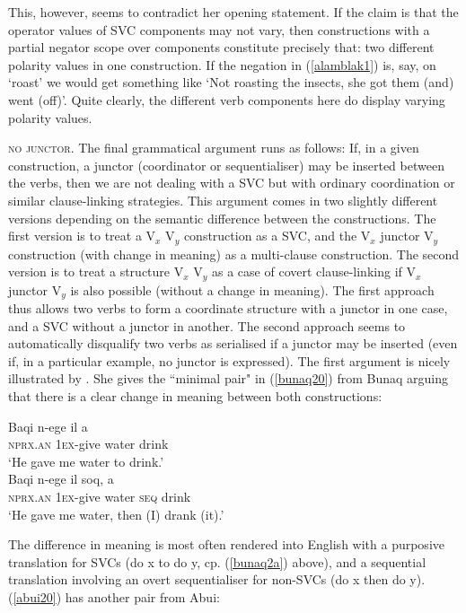 This, however, seems to contradict her opening statement. If the claim is that the operator values of SVC components may not vary, then constructions with a partial negator scope over components constitute precisely that: two different polarity values in one construction. If the negation in (\ref{alamblak1}) is, say, on `roast' we would get something like `Not roasting the insects, she got them (and) went (off)'. Quite clearly, the different verb components here do display varying polarity values.

\textsc{no junctor}. The final grammatical argument runs as follows: If, in a given construction, a junctor (coordinator or sequentialiser) may be inserted between the verbs, then we are not dealing with a SVC but with ordinary coordination or similar clause-linking strategies. This argument comes in two slightly different versions depending on the semantic difference between the constructions. The first version is to treat a V$_x$ V$_y$ construction as a SVC, and the V$_x$ junctor V$_y$ construction (with change in meaning) as a multi-clause construction. The second version is to treat a structure V$_x$ V$_y$ as a case of covert clause-linking if V$_x$ junctor V$_y$ is also possible (without a change in meaning). The first approach thus allows two verbs to form a coordinate structure with a junctor in one case, and a SVC without a junctor in another. The second approach seems to automatically disqualify two verbs as serialised if a junctor may be inserted (even if, in a particular example, no junctor is expressed). The first argument is nicely illustrated by \citet{schapper2009bunaq}. She gives the ``minimal pair" in (\ref{bunaq20}) from Bunaq arguing that there is a clear change in meaning between both constructions:

\ea \label{bunaq20} 
\ea \label{bunaq2a}
\gll Baqi n-ege il a \\
\textsc{nprx}.\textsc{an} \textsc{1}\textsc{ex}-give water drink \\
\glft `He gave me water to drink.’ \\ 
\ex
\gll Baqi n-ege il soq, a \\ 
\textsc{nprx}.\textsc{an} \textsc{1}\textsc{ex}-give water \textsc{seq} drink \\
\glft `He gave me water, then (I) drank (it).’\\ 
\z
\z

The difference in meaning is most often rendered into English with a purposive translation for SVCs (do x to do y, cp. (\ref{bunaq2a}) above), and a sequential translation involving an overt sequentialiser for non-SVCs (do x then do y). (\ref{abui20}) has another pair from Abui:

